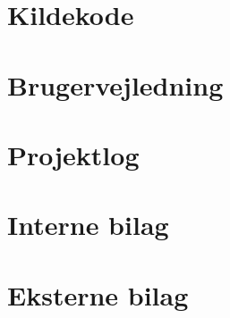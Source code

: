 \documentclass[12pt]{report}
\begin{document}
\chapter{Kildekode}




\chapter{Brugervejledning}



\chapter{Projektlog}

\newpage

\chapter{Interne bilag}
%


\chapter{Eksterne bilag}
%
\end{document}
